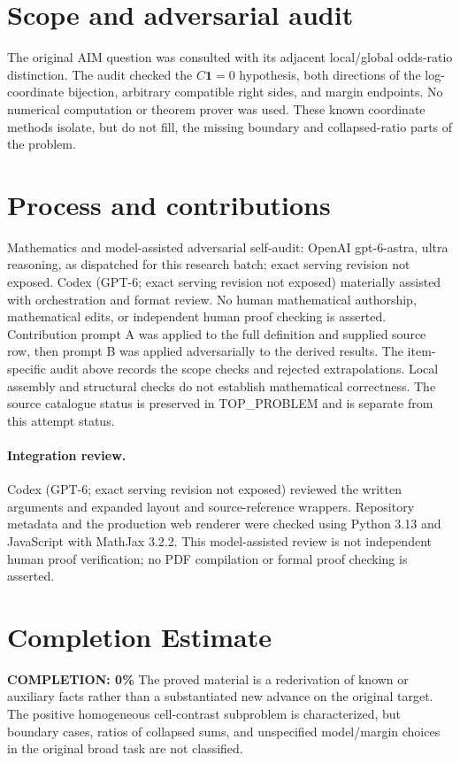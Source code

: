 \documentclass[11pt]{article}
\begin{document}
\section{Scope and adversarial audit}
The original AIM question was consulted with its adjacent local/global
odds-ratio distinction. The audit checked the $C\boldsymbol1=0$ hypothesis,
both directions of the log-coordinate bijection, arbitrary compatible
right sides, and margin endpoints. No numerical computation or theorem
prover was used. These known coordinate methods isolate, but do not fill,
the missing boundary and collapsed-ratio parts of the problem.

\section{Process and contributions}
Mathematics and model-assisted adversarial self-audit: OpenAI gpt-6-astra, ultra reasoning, as dispatched for this research batch; exact serving revision not exposed. Codex (GPT-6; exact serving revision not exposed) materially assisted with orchestration and format review. No human mathematical authorship, mathematical edits, or independent human proof checking is asserted.
Contribution prompt A was applied to the full definition and supplied source row, then prompt B was applied adversarially to the derived results. The item-specific audit above records the scope checks and rejected extrapolations. Local assembly and structural checks do not establish mathematical correctness. The source catalogue status is preserved in TOP\_PROBLEM and is separate from this attempt status.
\paragraph{Integration review.} Codex (GPT-6; exact serving revision not exposed) reviewed the written arguments and expanded layout and source-reference wrappers. Repository metadata and the production web renderer were checked using Python 3.13 and JavaScript with MathJax 3.2.2. This model-assisted review is not independent human proof verification; no PDF compilation or formal proof checking is asserted.

\section{Completion Estimate}
\noindent\textbf{COMPLETION: 0\%}
The proved material is a rederivation of known or auxiliary facts rather than a substantiated new advance on the original target. The positive homogeneous cell-contrast subproblem is characterized, but boundary cases, ratios of collapsed sums, and unspecified model/margin choices in the original broad task are not classified.
\end{document}
